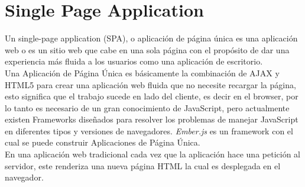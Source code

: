 
\section{Single Page Application}
\label{sec:Single Page App}

Un single-page application (SPA), o aplicación de página única es una aplicación web o es un sitio web que cabe en una sola página con el propósito de dar una experiencia más fluida a los usuarios como una aplicación de escritorio. \cite{spa_wiki}\\

Una Aplicación de Página Única es básicamente la combinación de AJAX y HTML5 para crear una aplicación web fluida que no necesite recargar la página, esto significa que el trabajo sucede en lado del cliente, es decir en el browser, por lo tanto es necesario de un gran conocimiento de JavaScript, pero actualmente existen Frameworks diseñados para resolver los problemas de manejar JavaScript en diferentes tipos y versiones de navegadores. \emph{Ember.js} es un framework con el cual se puede construir Aplicaciones de Página Única. \\





En una aplicación web tradicional cada vez que la aplicación hace una petición al servidor, este renderiza una nueva página HTML la cual es desplegada en el navegador.\\



